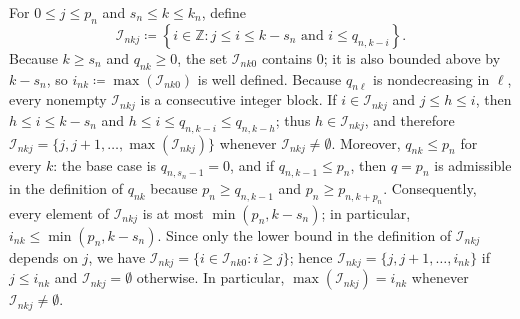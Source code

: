 \documentclass[11pt]{article}
\newcommand{\Z}{\mathbb{Z}}
\newcommand{\I}{\mathcal{I}}
\theoremstyle{definition}
\begin{document}
For $0 \leq j \leq p_n$ and $s_n\leq k\leq k_n$, define
\[
\I_{nkj}
\coloneqq
\left\{
i\in\Z:
j\leq i\leq k - s_n \text{ and } i \leq q_{n,k-i}
\right\}.
\]
Because $k \geq s_n$ and $q_{nk} \geq 0$, the set \(\I_{nk0}\) contains $0$; it is also bounded above by $k - s_n$, so \(i_{nk}\coloneqq\max(\I_{nk0})\) is well defined.
Because \(q_{n\ell}\) is nondecreasing in \(\ell\), every nonempty
\(\I_{nkj}\) is a consecutive integer block.
If \(i\in\I_{nkj}\) and \(j\leq h\leq i\), then $h \leq i \leq k - s_n$ and $h\leq i\leq q_{n,k-i} \leq q_{n,k-h}$;
thus \(h\in\I_{nkj}\), and therefore
$
\I_{nkj}=\{j,j+1,\ldots,\max(\I_{nkj})\}
$
whenever \(\I_{nkj}\neq\emptyset\).
Moreover, $q_{nk} \leq p_n$ for every $k$: the base case is $q_{n,s_n-1} = 0$, and if $q_{n,k-1} \leq p_n$, then $q = p_n$ is admissible in the definition of $q_{nk}$ because $p_n \geq q_{n,k-1}$ and $p_n \geq p_{n,k+p_n}$.
Consequently, every element of $\I_{nkj}$ is at most $\min(p_n, k - s_n)$; in particular, $i_{nk} \leq \min(p_n, k - s_n)$.
Since only the lower bound in the definition of $\I_{nkj}$ depends on $j$, we have $\I_{nkj} = \{i \in \I_{nk0} : i \geq j\}$; hence $\I_{nkj} = \{j, j+1, \ldots, i_{nk}\}$ if $j \leq i_{nk}$ and $\I_{nkj} = \emptyset$ otherwise.
In particular, $\max(\I_{nkj}) = i_{nk}$ whenever $\I_{nkj} \neq \emptyset$.
\end{document}
